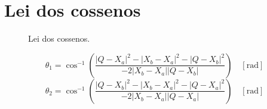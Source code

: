 \chapter{Lei dos cossenos}

\begin{center}
    \begin{figure}
        \centering
        
        \caption{Lei dos cossenos.}
        \label{fig:lei_dos_cossenos}
    \end{figure}
\end{center}

\begin{equation}
    \theta_1 = \cos^{-1}\left(\dfrac{|Q-X_a|^2 - |X_b-X_a|^2 - |Q-X_b|^2}{-2|X_b-X_a||Q-X_b|}\right) \quad [\si{\radian}]
\end{equation}
\begin{equation}
    \theta_2 = \cos^{-1}\left(\dfrac{|Q-X_b|^2 - |X_b-X_a|^2 - |Q-X_a|^2}{-2|X_b-X_a||Q-X_a|}\right) \quad [\si{\radian}]
\end{equation}